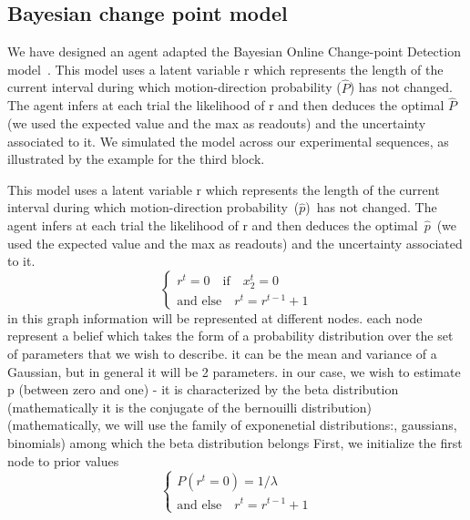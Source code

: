\documentclass[profile,final,english, draft]{article}%
\newcommand{\choice}[1]{ %
	\left\{ %
		\begin{array}{l} #1 \end{array} %
	\right. }
\newcommand{\eql}[1]{\begin{equation}#1\end{equation}}
\newcommand{\citep}[1]{\parencite{#1}}
\begin{document}
\subsection{Bayesian change point model}
We have designed an agent adapted the Bayesian Online Change-point Detection model~\citep{AdamsMackay2007}. This model uses a latent variable r which represents the length of the current interval during which motion-direction probability ($\hat{P}$) has not changed. The agent infers at each trial the likelihood  of r and then deduces the optimal $\hat{P}$ (we used the expected value and the max as readouts) and the uncertainty associated to it. We simulated the model across our experimental sequences, as illustrated by the example for the third block.

This model uses a latent variable r which represents the length of the current interval during which motion-direction probability~($\hat{p}$)~has not changed. The agent infers at each trial the likelihood of r and then deduces the optimal~$\hat{p}$~(we used the expected value and the max as readouts) and the uncertainty associated to it.
\eql{\choice{
r^t = 0 \quad \text{if} \quad x_2^t=0 \\
\text{and else} \quad r^t = r^{t-1} +1 }\label{eq:run_length}}
 in this graph information will be represented at different nodes. each node represent a belief which takes the form of a probability distribution over the set of parameters that we wish to describe.
it can be the mean and variance of a Gaussian, but in general it will be 2 parameters. in our case, we wish to estimate p (between zero and one) - it is characterized by the beta distribution (mathematically it is the conjugate of the bernouilli distribution)
 (mathematically, we will use the family of exponenetial distributions:, gaussians, binomials) among which the beta distribution belongs
First, we initialize the first node to prior values
\eql{\choice{
P(r^t = 0) = 1 / \lambda  \\
\text{and else} \quad r^t = r^{t-1} +1 }\label{eq:run_length}}
\end{document}
